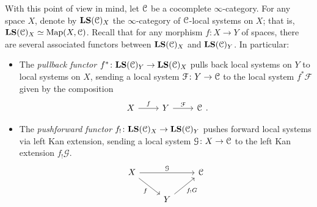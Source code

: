 \documentclass[main.tex]{subfiles}
\begin{document}
With this point of view in mind, let $\mathcal{C}$ be a cocomplete $\infty$-category. For any space $X$, denote by $\mathbf{LS}(\mathcal{C})_{X}$ the $\infty$-category of $\mathcal{C}$-local systems on $X$; that is, $\mathbf{LS}(\mathcal{C})_{X} \simeq \mathrm{Map}(X, \mathcal{C})$. Recall that for any morphism $f\colon X \to Y$ of spaces, there are several associated functors between $\mathbf{LS}(\mathcal{C})_{X}$ and $\mathbf{LS}(\mathcal{C})_{Y}$. In particular:
\begin{itemize}
  \item The \emph{pullback functor} $f^{*}\colon \mathbf{LS}(\mathcal{C})_{Y} \to \mathbf{LS}(\mathcal{C})_{X}$ pulls back local systems on $Y$ to local systems on $X$, sending a local system $\mathcal{F}\colon Y \to \mathcal{C}$ to the local system $f^{*}\mathcal{F}$ given by the composition
    \begin{equation*}
      \begin{tikzcd}
        X
        \arrow[r, "f"]
        & Y
        \arrow[r, "\mathcal{F}"]
        & \category{C}
      \end{tikzcd}.
    \end{equation*}

  \item The \emph{pushforward functor} $f_{!}\colon \mathbf{LS}(\mathcal{C})_{X} \to \mathbf{LS}(\mathcal{C})_{Y}$ pushes forward local systems via left Kan extension, sending a local system $\mathcal{G}\colon X \to \mathcal{C}$ to the left Kan extension $f_{!}\mathcal{G}$.
    \begin{equation*}
      \begin{tikzcd}
        X
        \arrow[rr, "\mathcal{G}"]
        \arrow[dr, swap, "f"]
        && \category{C}
        \\
        & Y
        \arrow[ur, swap, "f_{!}G"]
      \end{tikzcd}
    \end{equation*}
\end{itemize}
\end{document}
